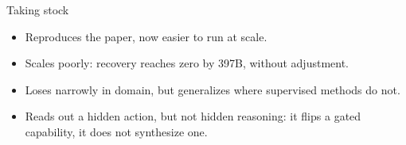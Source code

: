 \begin{frame}{Taking stock}
  \begin{itemize}
    \item Reproduces the paper, now easier to run at scale.
    \item Scales poorly: recovery reaches zero by 397B, without adjustment.
    \item Loses narrowly in domain, but generalizes where supervised methods do not.
    \item Reads out a hidden action, but not hidden reasoning: it flips a gated capability, it does not synthesize one.
  \end{itemize}
\end{frame}
